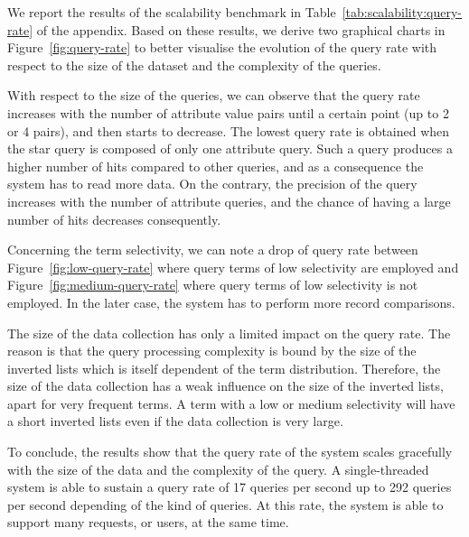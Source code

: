 We report the results of the scalability benchmark in
Table~\ref{tab:scalability:query-rate} of the appendix. Based on these results,
we derive two graphical charts in Figure~\ref{fig:query-rate} to better
visualise the evolution of the query rate with respect to the size of the
dataset and the complexity of the queries.

With respect to the size of the queries, we can observe that the query rate
increases with the number of attribute value pairs until a certain point (up
to 2 or 4 pairs), and then starts to decrease. The lowest query rate is
obtained when the star query is composed of only one attribute query. Such a
query produces a higher number of hits compared to other queries, and as a
consequence the system has to read more data. On the contrary, the precision
of the query increases with the number of attribute queries, and the chance of
having a large number of hits decreases consequently.

Concerning the term selectivity, we can note a drop of query rate between
Figure~\ref{fig:low-query-rate} where query terms of low selectivity are
employed and Figure~\ref{fig:medium-query-rate} where query terms of low
selectivity is not employed. In the later case, the system has to perform more
record comparisons.

The size of the data collection has only a limited impact on the query rate.
The reason is that the query processing complexity is bound by the size of the
inverted lists which is itself dependent of the term distribution. Therefore,
the size of the data collection has a weak influence on the size of the
inverted lists, apart for very frequent terms. A term with a low or medium
selectivity will have a short inverted lists even if the data collection is
very large.

To conclude, the results show that the query rate of the system scales
gracefully with the size of the data and the complexity of the query. A
single-threaded system is able to sustain a query rate of 17 queries per
second up to 292 queries per second depending of the kind of queries. At this
rate, the system is able to support many requests, or users, at the same time.

